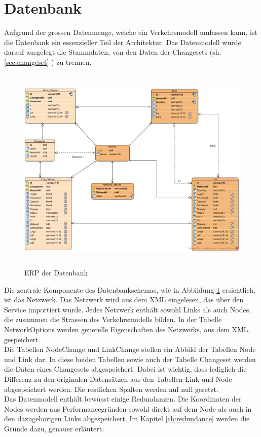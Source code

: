 \section{Datenbank}
Aufgrund der grossen Datenmenge, welche ein Verkehrsmodell umfassen kann, ist die Datenbank ein essenzieller Teil der Architektur. Das Datenmodell wurde darauf ausgelegt die Stammdaten, von den Daten der Changesets (sh. \ref{sec:changeset} ) zu trennen.\\
\begin{figure}[H]
\centering
\includegraphics[height=10cm]{images/SimmapDatabase.jpg}
\caption{ERP der Datenbank}
\label{fig:databasescheme}
\end{figure}
\noindent
Die zentrale Komponente des Datenbankschemas, wie in Abbildung \ref{fig:databasescheme} ersichtlich, ist das Netzwerk. Das Netzwerk wird aus dem XML eingelesen, das über den Service importiert wurde. Jedes Netzwerk enthält sowohl Links als auch Nodes, die zusammen die Strassen des Verkehrsmodells bilden. In der Tabelle Network\textunderscore Options werden generelle Eigenschaften des Netzwerks, aus dem XML, gespeichert.\\
Die Tabellen Node\textunderscore Change und Link\textunderscore Change stellen ein Abbild der Tabellen Node und Link dar. In diese beiden Tabellen sowie auch der Tabelle Changeset werden die Daten eines Changesets abgespeichert. Dabei ist wichtig, dass lediglich die Differenz zu den originalen Datensätzen aus den Tabellen Link und Node abgespeichert werden. Die restlichen Spalten werden auf null gesetzt.\\
Das Datenmodell enthält bewusst einige Redundanzen. Die Koordinaten der Nodes werden aus Performancegründen sowohl direkt auf dem Node als auch in den dazugehörigen Links abgespeichert. Im Kapitel \ref{ch:redundance}  werden die Gründe dazu, genauer erläutert.